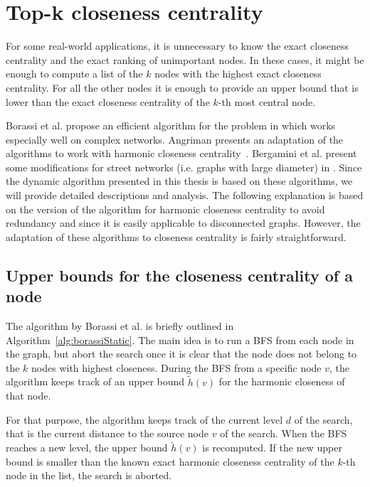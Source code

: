 \section{Top-k closeness centrality}
\label{sec:topKClosenessComplex}
For some real-world applications, it is unnecessary to know the exact closeness centrality and the exact ranking of unimportant nodes. In these cases, it might be enough to compute a list of the $k$ nodes with the highest exact closeness centrality. For all the other nodes it is enough to provide an upper bound that is lower than the exact closeness centrality of the $k$-th most central node.

Borassi et al. propose an efficient algorithm for the problem in \cite{borassi2015fast} which works especially well on complex networks. Angriman presents an adaptation of the algorithms to work with harmonic closeness centrality~\cite{angriman2016efficient}. Bergamini et al. present some modifications for street networks (i.e. graphs with large diameter) in \cite{bergamini2016computing}. Since the dynamic algorithm presented in this thesis is based on these algorithms, we will provide detailed descriptions and analysis. The following explanation is based on the version of the algorithm for harmonic closeness centrality to avoid redundancy and since it is easily applicable to disconnected graphs. However, the adaptation of these algorithms to closeness centrality is fairly straightforward. 

\subsection{Upper bounds for the closeness centrality of a node}
\label{sec:borassiUpperBound}
The algorithm by Borassi et al. is briefly outlined in Algorithm~\ref{alg:borassiStatic}. The main idea is to run a BFS from each node in the graph, but abort the search once it is clear that the node does not belong to the $k$ nodes with highest closeness. During the BFS from a specific node $v$, the algorithm keeps track of an upper bound $\widetilde{h}(v)$ for the harmonic closeness of that node.

For that purpose, the algorithm keeps track of the current level $d$ of the search, that is the current distance to the source node $v$ of the search. When the BFS reaches a new level, the upper bound $\widetilde{h}(v)$ is recomputed. If the new upper bound is smaller than the known exact harmonic closeness centrality of the $k$-th node in the list, the search is aborted. 

